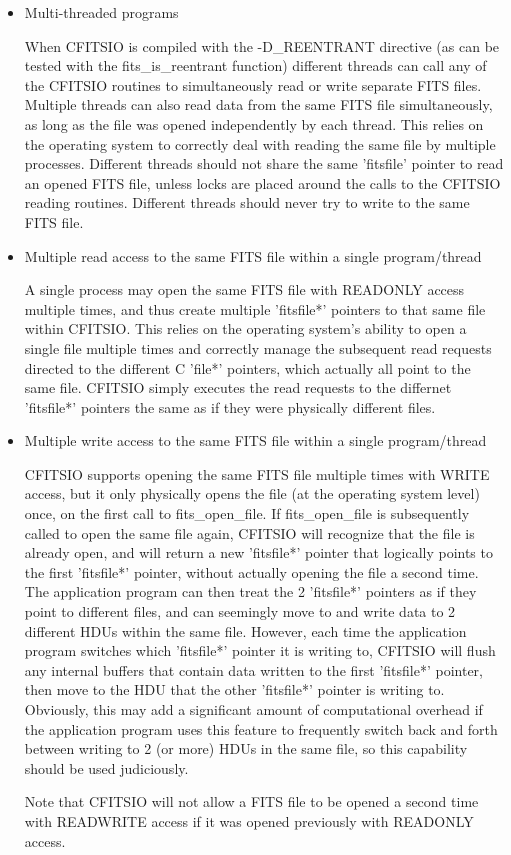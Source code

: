 \documentclass[11pt]{book}
\begin{document}
\begin{itemize}

\item
Multi-threaded programs

When CFITSIO is compiled with the -D\_REENTRANT directive (as can be
tested with the fits\_is\_reentrant function) different threads can
call any of the CFITSIO routines  to simultaneously read or write
separate  FITS files.  Multiple threads can also read data from the
same FITS file simultaneously, as long as the file was opened
independently by each thread.  This relies on the operating system
to correctly deal with reading the same file by multiple processes.
Different threads should not share the same 'fitsfile' pointer to
read an opened FITS file, unless locks are placed around the calls
to  the CFITSIO reading routines.  Different threads should  never
try to write to the same FITS file.

\item
Multiple read access to the same FITS file within a single
program/thread

A single process may open the same FITS file with READONLY access
multiple times, and thus create multiple 'fitsfile*' pointers to
that same file within CFITSIO. This relies on the operating system's
ability to open a single file multiple times and correctly manage
the subsequent read requests directed to the different C 'file*'
pointers, which actually all point to the same file.  CFITSIO simply
executes the read requests to the differnet 'fitsfile*' pointers the
same as if they were physically different files.

\item
Multiple write access to the same FITS file within a single
program/thread

CFITSIO supports opening the same FITS file multiple times with
WRITE access, but it only physically opens the file (at the
operating system level) once, on the first call to fits\_open\_file.
If fits\_open\_file is subsequently called to open the same file
again, CFITSIO will recognize that the file is already open, and
will return a new 'fitsfile*' pointer that logically points to the
first 'fitsfile*' pointer, without actually opening the file a
second time. The application program can then treat the 2
'fitsfile*' pointers as if they point to different files, and can
seemingly move to and write data to 2 different  HDUs within the
same file.  However, each time the application program switches
which 'fitsfile*' pointer it is writing to, CFITSIO will flush  any
internal buffers that contain data written to the first 'fitsfile*'
pointer,  then move to the HDU that the other 'fitsfile*' pointer
is writing to. Obviously, this may add a significant amount of
computational overhead if the  application program uses this feature
to frequently switch back and forth between writing to 2 (or more)
HDUs in the same file, so this capability should be used
judiciously.

Note that CFITSIO will not allow a FITS file to be opened a second
time with READWRITE access if it was opened previously with READONLY
access.

\end{itemize}
\end{document}
